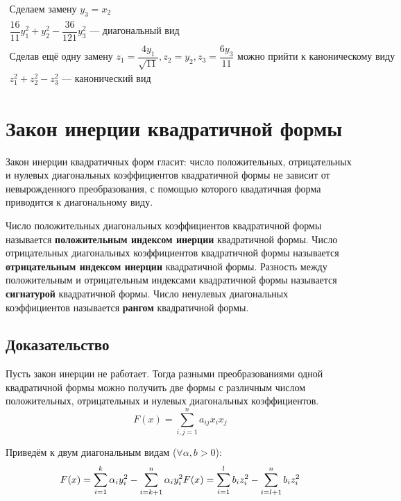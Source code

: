 \documentclass[12pt]{article}
\begin{document}
\[\begin{array}{l}
            \text{Сделаем замену } y_3 = x_2                                                                                                                \\
            \dfrac{16}{11}y_1^2 + y_2^2 - \dfrac{36}{121}y_3^2 \text{ — диагональный вид}                                                                   \\
            \text{Сделав ещё одну замену } z_1 = \dfrac{4y_1}{\sqrt{11}}, z_2 = y_2, z_3 = \dfrac{6y_3}{11} \text{ можно прийти к каноническому виду}       \\
            z_1^2 + z_2^2 - z_3^2 \text{ — канонический вид}
        \end{array}
    \]

    \section{Закон инерции квадратичной формы}
    Закон инерции квадратичных форм гласит: число положительных, отрицательных и нулевых диагональных коэффициентов квадратичной формы не зависит от невырожденного преобразования, с помощью которого квадатичная форма приводится к диагональному виду.

    Число положительных диагональных коэффициентов квадратичной формы называется \textbf{положительным индексом инерции} квадратичной формы. Число отрицательных диагональных коэффициентов квадратичной формы называется \textbf{отрицательным индексом инерции} квадратичной формы. Разность между положительным и отрицательным индексами квадратичной формы называется \textbf{сигнатурой} квадратичной формы. Число ненулевых диагональных коэффициентов называется \textbf{рангом} квадратичной формы.

    \subsection{Доказательство}
    Пусть закон инерции не работает. Тогда разными преобразованиями одной квадратичной формы можно получить две формы с различным числом положительных, отрицательных и нулевых диагональных коэффициентов.
    \[
        F(x) = \sum^n_{i,j=1}a_{ij}x_ix_j
    \]

    Приведём к двум диагональным видам ($\forall \alpha, b > 0$):
    \[
        F(x) = \sum^k_{i=1}\alpha_{i}y_i^2 - \sum^n_{i=k + 1}\alpha_{i}y_i^2
        \\
        F(x) = \sum_{i=1}^lb_iz_i^2 - \sum_{i = l + 1}^nb_iz_i^2
    \]
\end{document}
